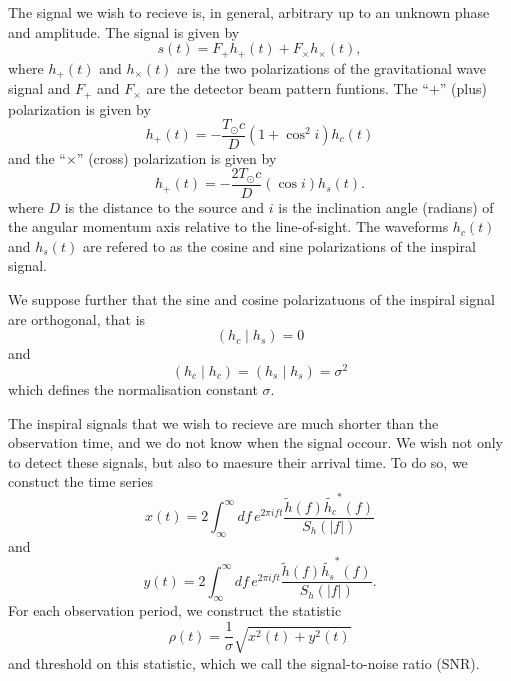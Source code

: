 The signal we wish to recieve is, in general, arbitrary up to an unknown phase
and amplitude. The signal is given by
\begin{equation}
s(t)= F_{+}h_{+}(t) + F_{\times}h_{\times}(t),
\end{equation}
where $h_{+}(t)$ and $h_{\times}(t)$ are the two polarizations of the
gravitational wave signal and $F_{+}$ and $F_{\times}$ are the detector beam
pattern funtions. The ``$+$'' (plus) polarization is given by
\begin{equation}
h_{+}(t) = -\frac{T_\odot c}{D}(1 + \cos^2 i)h_c(t)
\end{equation}
and the ``$\times$'' (cross) polarization is given by
\begin{equation}
h_{+}(t) = -\frac{2 T_\odot c}{D}(\cos i)h_s(t).
\end{equation}
where $D$ is the distance to the source and $i$ is the inclination angle
(radians) of the angular momentum axis relative to the line-of-sight. The
waveforms $h_c(t)$ and $h_s(t)$ are refered to as the cosine and sine
polarizations of the inspiral signal.

We suppose further that the sine and cosine polarizatuons of the inspiral
signal are orthogonal, that is
\begin{equation}
\left(h_c\mid h_s\right) = 0
\end{equation}
and
\begin{equation}
\left(h_c\mid h_c\right) = \left(h_s\mid h_s\right) = \sigma^2
\end{equation}
which defines the normalisation constant $\sigma$.

The inspiral signals that we wish to recieve are much shorter than the
observation time, and we do not know when the signal occour. We wish not only
to detect these signals, but also to maesure their arrival time. To do so, we
constuct the time series
\begin{equation}
x(t) = 2 \int_{\infty}^{\infty}df\,e^{2\pi i f t} 
\frac{\tilde{h}(f) \tilde{h_c}^\ast(f)}{S_h\left(\left|f\right|\right)}
\end{equation}
and
\begin{equation}
y(t) = 2 \int_{\infty}^{\infty}df\,e^{2\pi i f t} 
\frac{\tilde{h}(f) \tilde{h_s}^\ast(f)}{S_h\left(\left|f\right|\right)}.
\end{equation}
For each observation period, we construct the statistic
\begin{equation}
\rho(t) = \frac{1}{\sigma}\sqrt{x^2(t) + y^2(t)}
\end{equation}
and threshold on this statistic, which we call the signal-to-noise ratio
(SNR).

